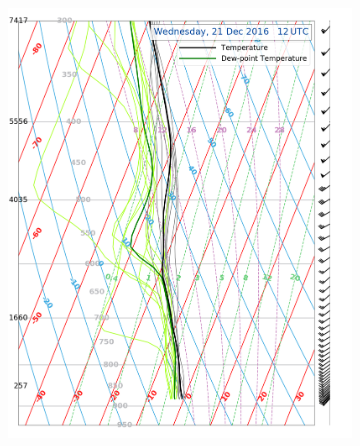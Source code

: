 \begin{figure}
	\begin{subfigure}[b]{0.49\textwidth}
		\includegraphics[width=\textwidth]{./fig_Sounding/20161220_36}
		\caption{}\label{fig:meps_sound_20}
	\end{subfigure}
	\begin{subfigure}[b]{0.49\textwidth}

\end{subfigure}
\end{figure}
